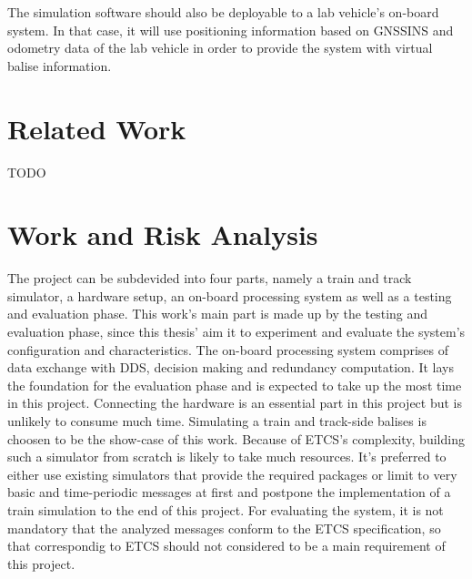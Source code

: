 \documentclass[a4paper, 12pt]{scrartcl}
\begin{document}
The simulation software should also be deployable to a lab vehicle's on-board system.
In that case, it will use positioning information based on \ac{GNSSINS} and odometry data of the lab vehicle in order to provide the system with virtual balise information.

\section*{Related Work}
TODO



\section*{Work and Risk Analysis}

The project can be subdevided into four parts, namely a train and track simulator, a hardware setup, an on-board processing system as well as a testing and evaluation phase.
This work's main part is made up by the testing and evaluation phase, since this thesis' aim it to experiment and evaluate the system's configuration and characteristics.
The on-board processing system comprises of data exchange with \ac{DDS}, decision making and redundancy computation.
It lays the foundation for the evaluation phase and is expected to take up the most time in this project.
Connecting the hardware is an essential part in this project but is unlikely to consume much time.
Simulating a train and track-side balises is choosen to be the show-case of this work.
Because of \ac{ETCS}'s complexity, building such a simulator from scratch is likely to take much resources.
It's preferred to either use existing simulators that provide the required packages or limit to very basic and time-periodic messages at first and postpone the implementation of a train simulation to the end of this project.
For evaluating the system, it is not mandatory that the analyzed messages conform to the \ac{ETCS} specification, so that correspondig to \ac{ETCS} should not considered to be a main requirement of this project.
\end{document}
